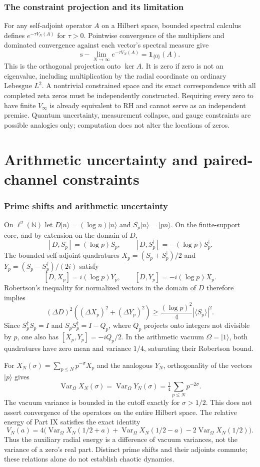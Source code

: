 \documentclass[11pt,a4paper]{article}
\theoremstyle{definition}\newtheorem{definition}[proposition]{Definition}
\theoremstyle{remark}\newtheorem{remark}[proposition]{Remark}
\begin{document}
\section{The constraint projection and its limitation}
For any self-adjoint operator $A$ on a Hilbert space, bounded spectral calculus defines $e^{-\tau V_N(A)}$ for $\tau>0$. Pointwise convergence of the multipliers and dominated convergence against each vector's spectral measure give
\[
\mathrm{s}\!-\!\lim_{N\to\infty}e^{-\tau V_N(A)}
=\mathbf 1_{\{0\}}(A).
\]
This is the orthogonal projection onto $\ker A$. It is zero if zero is not an eigenvalue, including multiplication by the radial coordinate on ordinary Lebesgue $L^2$. A nontrivial constrained space and its exact correspondence with all completed zeta zeros must be independently constructed. Requiring every zero to have finite $V_\infty$ is already equivalent to RH and cannot serve as an independent premise. Quantum uncertainty, measurement collapse, and gauge constraints are possible analogies only; computation does not alter the locations of zeros.

\part{Arithmetic uncertainty and paired-channel constraints}

\section{Prime shifts and arithmetic uncertainty}
On $\ell^2(\mathbb N)$ let $D|n\rangle=(\log n)|n\rangle$ and $S_p|n\rangle=|pn\rangle$. On the finite-support core, and by extension on the domain of $D$,
\[
[D,S_p]=(\log p)S_p,\qquad
[D,S_p^\dagger]=-(\log p)S_p^\dagger.
\]
The bounded self-adjoint quadratures $X_p=(S_p+S_p^\dagger)/2$ and $Y_p=(S_p-S_p^\dagger)/(2i)$ satisfy
\[
[D,X_p]=i(\log p)Y_p,\qquad [D,Y_p]=-i(\log p)X_p.
\]
Robertson's inequality for normalized vectors in the domain of $D$ therefore implies
\[
(\Delta D)^2((\Delta X_p)^2+(\Delta Y_p)^2)
\ge\frac{(\log p)^2}{4}|\langle S_p\rangle|^2.
\]
Since $S_p^\dagger S_p=I$ and $S_p S_p^\dagger=I-Q_p$, where $Q_p$ projects onto integers not divisible by $p$, one also has $[X_p,Y_p]=-iQ_p/2$. In the arithmetic vacuum $\Omega=|1\rangle$, both quadratures have zero mean and variance $1/4$, saturating their Robertson bound.

For $X_N(\sigma)=\sum_{p\le N}p^{-\sigma}X_p$ and the analogous $Y_N$, orthogonality of the vectors $|p\rangle$ gives
\[
\operatorname{Var}_\Omega X_N(\sigma)=\operatorname{Var}_\Omega Y_N(\sigma)
=\tfrac14\sum_{p\le N}p^{-2\sigma}.
\]
The vacuum variance is bounded in the cutoff exactly for $\sigma>1/2$. This does not assert convergence of the operators on the entire Hilbert space. The relative energy of Part IX satisfies the exact identity
\[
V_N(a)=4\bigl(\operatorname{Var}_\Omega X_N(1/2+a)
+\operatorname{Var}_\Omega X_N(1/2-a)
-2\operatorname{Var}_\Omega X_N(1/2)\bigr).
\]
Thus the auxiliary radial energy is a difference of vacuum variances, not the variance of a zero's real part. Distinct prime shifts and their adjoints commute; these relations alone do not establish chaotic dynamics.
\end{document}
